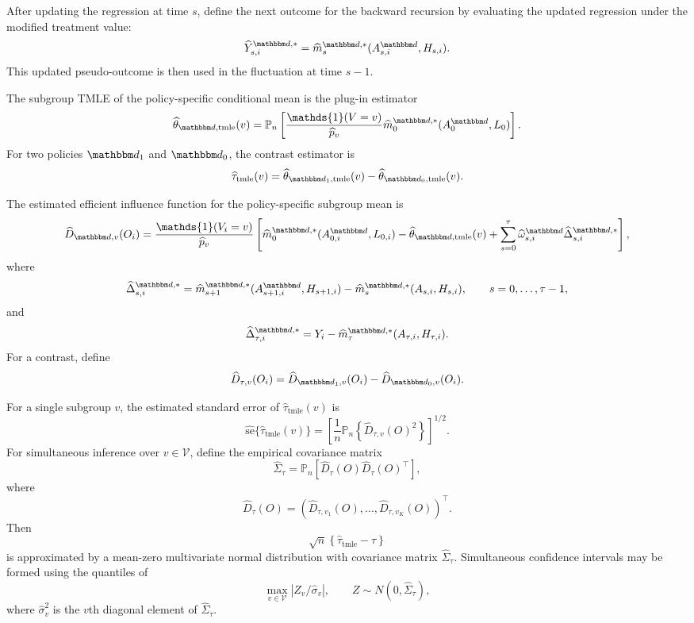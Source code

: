 \documentclass[11pt]{article}
\begin{document}
After updating the regression at time \(s\), define the next outcome for the
backward recursion by evaluating the updated regression under the modified
treatment value:
\[
  \widehat Y_{s,i}^{\mathbbm d,*}
  =
  \widehat m_{s}^{\mathbbm d,*}
  (A_{s,i}^{\mathbbm d},H_{s,i}).
\]
This updated pseudo-outcome is then used in the fluctuation at time \(s-1\).

The subgroup TMLE of the policy-specific conditional mean is the plug-in
estimator
\[
  \widehat\theta_{\mathbbm d,\mathrm{tmle}}(v)
  =
  \mathbb{P}_n
  \left[
    \frac{\mathds{1}(V=v)}{\widehat p_v}
    \widehat m_0^{\mathbbm d,*}(A_0^{\mathbbm d},L_0)
  \right].
\]
For two policies \(\mathbbm d_1\) and \(\mathbbm d_0\), the contrast estimator is
\[
  \widehat\tau_{\mathrm{tmle}}(v)
  =
  \widehat\theta_{\mathbbm d_1,\mathrm{tmle}}(v)
  -
  \widehat\theta_{\mathbbm d_0,\mathrm{tmle}}(v).
\]

The estimated efficient influence function for the policy-specific subgroup
mean is
\[
  \widehat D_{\mathbbm d,v}(O_i)
  =
  \frac{\mathds{1}(V_i=v)}{\widehat p_v}
  \left[
    \widehat m_0^{\mathbbm d,*}(A_{0,i}^{\mathbbm d},L_{0,i})
    -
    \widehat\theta_{\mathbbm d,\mathrm{tmle}}(v)
    +
    \sum_{s=0}^{\tau}
    \widehat\omega_{s,i}^{\mathbbm d}
    \widehat\Delta_{s,i}^{\mathbbm d,*}
  \right],
\]
where
\[
  \widehat\Delta_{s,i}^{\mathbbm d,*}
  =
  \widehat m_{s+1}^{\mathbbm d,*}
  (A_{s+1,i}^{\mathbbm d},H_{s+1,i})
  -
  \widehat m_{s}^{\mathbbm d,*}(A_{s,i},H_{s,i}),
  \qquad s=0,\ldots,\tau-1,
\]
and
\[
  \widehat\Delta_{\tau,i}^{\mathbbm d,*}
  =
  Y_i
  -
  \widehat m_{\tau}^{\mathbbm d,*}(A_{\tau,i},H_{\tau,i}).
\]
For a contrast, define
\[
  \widehat D_{\tau,v}(O_i)
  =
  \widehat D_{\mathbbm d_1,v}(O_i)
  -
  \widehat D_{\mathbbm d_0,v}(O_i).
\]

For a single subgroup \(v\), the estimated standard error of
\(\widehat\tau_{\mathrm{tmle}}(v)\) is
\[
  \widehat{\mathrm{se}}\{\widehat\tau_{\mathrm{tmle}}(v)\}
  =
  \left[
    \frac{1}{n}
    \mathbb{P}_n
    \left\{
      \widehat D_{\tau,v}(O)^2
    \right\}
  \right]^{1/2}.
\]
For simultaneous inference over \(v\in\mathcal V\), define the empirical
covariance matrix
\[
  \widehat\Sigma_{\tau}
  =
  \mathbb{P}_n
  \left[
    \widehat D_{\tau}(O)
    \widehat D_{\tau}(O)^\top
  \right],
\]
where
\[
  \widehat D_{\tau}(O)
  =
  \left(
    \widehat D_{\tau,v_1}(O),
    \ldots,
    \widehat D_{\tau,v_K}(O)
  \right)^\top.
\]
Then
\[
  \sqrt n
  \left\{
    \widehat\tau_{\mathrm{tmle}}-\tau
  \right\}
\]
is approximated by a mean-zero multivariate normal distribution with covariance
matrix \(\widehat\Sigma_\tau\). Simultaneous confidence intervals may be formed
using the quantiles of
\[
  \max_{v\in\mathcal V}
  \left|
    Z_v / \widehat\sigma_v
  \right|,
  \qquad
  Z\sim N(0,\widehat\Sigma_\tau),
\]
where \(\widehat\sigma_v^2\) is the \(v\)th diagonal element of
\(\widehat\Sigma_\tau\).
\end{document}
